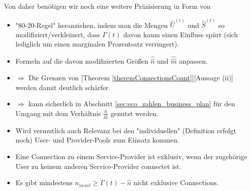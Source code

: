 Von daher benötigen wir noch eine weitere Präzisierung in Form von

\begin{itemize}
  \item "80-20-Regel" heranziehen, indem man die Mengen $\widehat{U}^{(t)}$ und $\widehat{S}^{(t)}$ so modifiziert/verkleinert, dass $\Gamma(t)$ davon kaum einen Einfluss spürt (sich lediglich um einen marginalen Prozentsatz verringert).
  \item Formeln auf die davon modifizierten Größen $\widehat{\widehat{n}}$ und $\widehat{\widehat{m}}$ anpassen.
  \item $\Rightarrow$ Die Grenzen von [Theorem \ref{theremConnectionsCount}][Aussage (ii)] werden damit deutlich schärfer.
  \item $\Rightarrow$ kann sicherlich in Abschnitt \ref{sec:eco_zahlen_business_plan} für den Umgang mit dem Verhältnis $\frac{\widehat{n}}{\widehat{m}}$ genutzt werden.
  \item Wird vermutlich auch Relevanz bei den "individuellen" (Definition erfolgt noch) User- und Provider-Pools zum Einsatz kommen.
\end{itemize}

\vspace{1cm}

\vspace{0.3cm}

\begin{itemize}
  \item Eine Connection zu einem Service-Provider ist exklusiv, wenn der zugehörige User zu keinem anderen Service-Provider connectet ist.
    \item Es gibt mindestens $n_{nexcl} \geq \Gamma(t) - \widehat{n}$ nicht exklusive Connections.
  
\end{itemize}

\vspace{1cm}

















\vspace{1cm}


